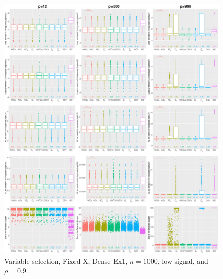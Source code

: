 \begin{figure}[!ht]
\centering
\includegraphics[width=\textwidth]{figures/supplement/fixedx/subset_selection/Dense-Ex1_n1000_lsnr_rho09.eps}
\caption{Variable selection, Fixed-X, Dense-Ex1, $n=1000$, low signal, and $\rho=0.9$.}
\end{figure}
\clearpage
